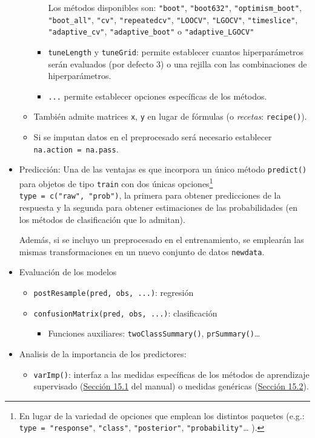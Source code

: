 \documentclass[
  spanish,
]{book}
\providecommand{\tightlist}{%
  \setlength{\itemsep}{0pt}\setlength{\parskip}{0pt}}
\theoremstyle{break}
\theoremstyle{definition}
\theoremstyle{definition}
\theoremstyle{definition}
\theoremstyle{remark}
\begin{document}
\begin{itemize}
\begin{itemize}
\begin{itemize}
      Los métodos disponibles son: \texttt{"boot"}, \texttt{"boot632"}, \texttt{"optimism\_boot"}, \texttt{"boot\_all"}, \texttt{"cv"}, \texttt{"repeatedcv"}, \texttt{"LOOCV"}, \texttt{"LGOCV"}, \texttt{"timeslice"}, \texttt{"adaptive\_cv"}, \texttt{"adaptive\_boot"} o \texttt{"adaptive\_LGOCV"}
    \item
      \texttt{tuneLength} y \texttt{tuneGrid}: permite establecer cuantos hiperparámetros serán evaluados (por defecto 3) o una rejilla con las combinaciones de hiperparámetros.
    \item
      \texttt{...} permite establecer opciones específicas de los métodos.
    \end{itemize}
  \item
    También admite matrices \texttt{x}, \texttt{y} en lugar de fórmulas (o \emph{recetas}: \texttt{recipe()}).
  \item
    Si se imputan datos en el preprocesado será necesario establecer \texttt{na.action\ =\ na.pass}.
  \end{itemize}
\item
  Predicción: Una de las ventajas es que incorpora un único método \texttt{predict()} para objetos de tipo \texttt{train} con dos únicas opciones\footnote{En lugar de la variedad de opciones que emplean los distintos paquetes (e.g.: \texttt{type\ =\ "response"}, \texttt{"class"}, \texttt{"posterior"}, \texttt{"probability"}\ldots{} ).} \texttt{type\ =\ c("raw",\ "prob")}, la primera para obtener predicciones de la respuesta y la segunda para obtener estimaciones de las probabilidades (en los métodos de clasificación que lo admitan).

  Además, si se incluyo un preprocesado en el entrenamiento, se emplearán las mismas transformaciones en un nuevo conjunto de datos \texttt{newdata}.
\item
  Evaluación de los modelos

  \begin{itemize}
  \item
    \texttt{postResample(pred,\ obs,\ ...)}: regresión
  \item
    \texttt{confusionMatrix(pred,\ obs,\ ...)}: clasificación

    \begin{itemize}
    \tightlist
    \item
      Funciones auxiliares: \texttt{twoClassSummary()}, \texttt{prSummary()}\ldots{}
    \end{itemize}
  \end{itemize}
\item
  Analisis de la importancia de los predictores:

  \begin{itemize}
  \tightlist
  \item
    \texttt{varImp()}: interfaz a las medidas específicas de los métodos de aprendizaje supervisado (\href{https://topepo.github.io/caret/variable-importance.html\#model-specific-metrics}{Sección 15.1} del manual) o medidas genéricas (\href{https://topepo.github.io/caret/variable-importance.html\#model-independent-metrics}{Sección 15.2}).
  \end{itemize}
\end{itemize}
\end{document}
